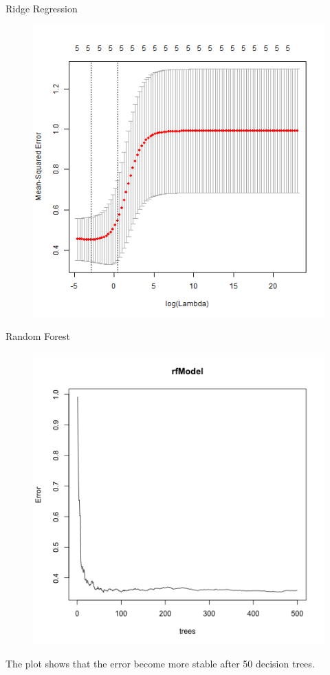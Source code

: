 \documentclass{article}
\begin{document}
Ridge Regression
\begin{figure}[h!]
\includegraphics{../images/ridgeCV_top.png}
\end{figure}


Random Forest 
\begin{figure}[h!]
\includegraphics{../images/rf_top.png}
\end{figure}
The plot shows that the error become more stable after 50 decision trees.
\end{document}
